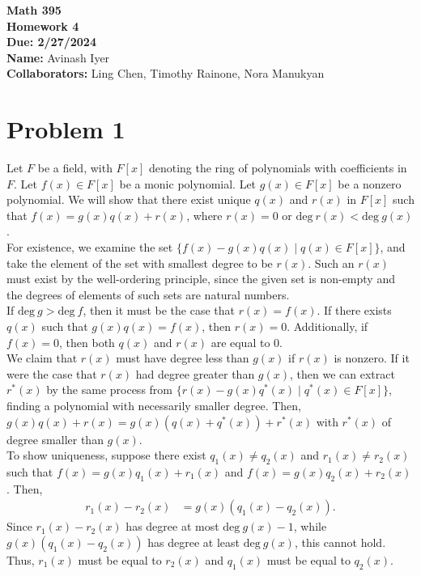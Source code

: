 \documentclass[8pt]{extarticle}
\title{}
\author{}
\date{}
\begin{document}
  \begin{center}
    {\bf \Large Math 395 \\[0.1in]Homework 4 \\[0.1in]
    Due: 2/27/2024}\\[.25in]
    {\bf Name:} {Avinash Iyer}\\[0.15in]
    {\bf Collaborators:} {Ling Chen, Timothy Rainone, Nora Manukyan} \\
  \end{center}
  \section{Problem 1}%
  Let $F$ be a field, with $F[x]$ denoting the ring of polynomials with coefficients in $F$. Let $f(x)\in F[x]$ be a monic polynomial. Let $g(x) \in F[x]$ be a nonzero polynomial. We will show that there exist unique $q(x)$ and $r(x)$ in $F[x]$ such that $f(x) = g(x)q(x) + r(x)$, where $r(x) = 0$ or $\text{deg}~r(x) < \text{deg}~g(x)$.\\

  For existence, we examine the set $\{f(x) - g(x)q(x)\mid q(x)\in F[x]\}$, and take the element of the set with smallest degree to be $r(x)$. Such an $r(x)$ must exist by the well-ordering principle, since the given set is non-empty and the degrees of elements of such sets are natural numbers.\\

  If $\text{deg}~g > \text{deg}~f$, then it must be the case that $r(x) = f(x)$. If there exists $q(x)$ such that $g(x)q(x) = f(x)$, then $r(x) = 0$. Additionally, if $f(x) = 0$, then both $q(x)$ and $r(x)$ are equal to $0$.\\

  We claim that $r(x)$ must have degree less than $g(x)$ if $r(x)$ is nonzero. If it were the case that $r(x)$ had degree greater than $g(x)$, then we can extract $r^{\ast}(x)$ by the same process from $\{r(x) - g(x)q^{\ast}(x)\mid q^{\ast}(x)\in F[x]\}$, finding a polynomial with necessarily smaller degree. Then, $g(x)q(x) + r(x) = g(x)(q(x) + q^{\ast}(x)) + r^{\ast}(x)$ with $r^{\ast}(x)$ of degree smaller than $g(x)$.\\

  To show uniqueness, suppose there exist $q_1(x)\neq q_2(x)$ and $r_1(x)\neq r_2(x)$ such that $f(x) = g(x)q_1(x) + r_1(x)$ and $f(x)=g(x)q_2(x) + r_2(x)$. Then,
  \begin{align*}
    r_1(x)-r_2(x) &= g(x)\left(q_1(x)-q_2(x)\right).
  \end{align*}
  Since $r_1(x)-r_2(x)$ has degree at most $\text{deg}~g(x) - 1$, while $g(x)\left(q_1(x)-q_2(x)\right)$ has degree at least $\text{deg}~g(x)$, this cannot hold. Thus, $r_1(x)$ must be equal to $r_2(x)$ and $q_1(x)$ must be equal to $q_2(x)$.
\end{document}
